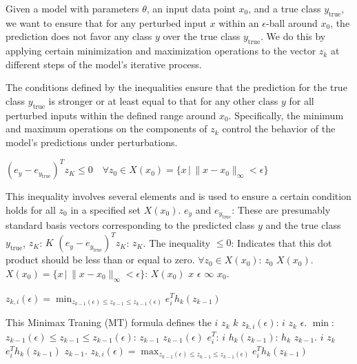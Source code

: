 
Given a model with parameters $\theta$, an input data point $x_0$, and a true class $y_{\text{true}}$, we want to ensure that for any perturbed input $x$ within an $\epsilon$-ball around $x_0$, the prediction does not favor any class $y$ over the true class $y_{\text{true}}$. We do this by applying certain minimization and maximization operations to the vector $z_k$ at different steps of the model's iterative process.

The conditions defined by the inequalities ensure that the prediction for the true class $y_{\text{true}}$ is stronger or at least equal to that for any other class $y$ for all perturbed inputs within the defined range around $x_0$. Specifically, the minimum and maximum operations on the components of $z_k$ control the behavior of the model's predictions under perturbations.

$(e_y - e_{y_{\text{true}}})^T z_K \leq 0 \quad \forall z_0 \in X(x_0) = \{x \,|\, \|x - x_0\|_{\infty} < \epsilon\}$

This inequality involves several elements and is used to ensure a certain condition holds for all  $z_0$ in a specified set $X(x_0)$. 
$e_y$ and $e_{y_{\text{true}}}$: These are presumably standard basis vectors corresponding to the predicted class $y$ and the true class $y_{\text{true}}$, $z_K$:  $K$ 
$(e_y - e_{y_{\text{true}}})^T z_K$:  $z_K$.
The inequality $\leq 0$: Indicates that this dot product should be less than or equal to zero.
$\forall z_0 \in X(x_0)$:  $z_0$  $X(x_0)$.
$X(x_0) = \{x \,|\, \|x - x_0\|_{\infty} < \epsilon\}$:  $X(x_0)$  $x$  $\epsilon$  $\infty$  $x_0$.

$z_{k,i}(\epsilon) = \min_{z_{k-1}(\epsilon) \leq z_{k-1} \leq z_{k-1}(\epsilon)} e^T_i h_k(z_{k-1})$

This Minimax Traning (MT) formula defines the $i$  $z_k$  $k$ 
$z_{k,i}(\epsilon)$:  $i$  $z_k$  $\epsilon$.
$\min$: 
$z_{k-1}(\epsilon) \leq z_{k-1} \leq z_{k-1}(\epsilon)$:  $z_{k-1}$  $z_{k-1}(\epsilon)$ 
$e^T_i$:  $i$ 
$h_k(z_{k-1})$:  $h_k$  $z_{k-1}$.
 $i$  $z_k$  $e^T_i h_k(z_{k-1})$  $z_{k-1}$.
$z_{k,i}(\epsilon) = \max_{z_{k-1}(\epsilon) \leq z_{k-1} \leq z_{k-1}(\epsilon)} e^T_i h_k(z_{k-1})$

